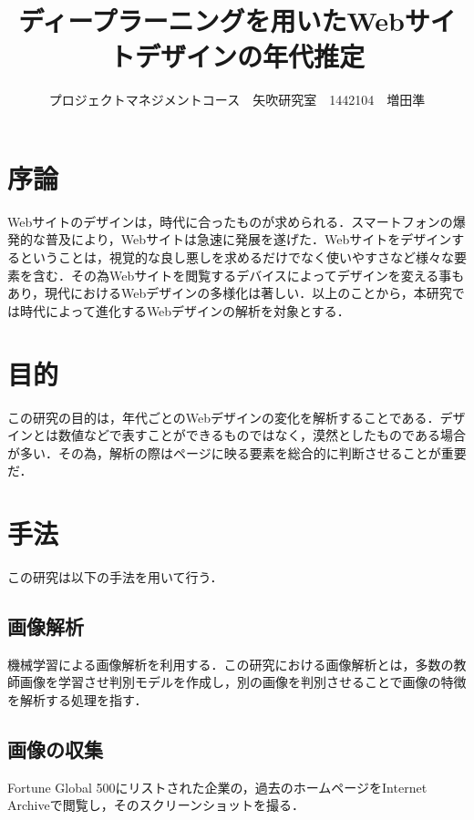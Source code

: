 \documentclass[uplatex,twocolumn,dvipdfmx]{jsarticle}
\title{\vspace{-5mm}\fontsize{14pt}{0pt}\selectfont ディープラーニングを用いたWebサイトデザインの年代推定}
\author{\normalsize プロジェクトマネジメントコース　矢吹研究室　1442104　増田準}
\date{}
\begin{document}
\fontsize{10.5pt}{\baselineskip}\selectfont
\maketitle





\section{序論}\label{序論}

Webサイトのデザインは，時代に合ったものが求められる\cite{bib001}．スマートフォンの爆発的な普及により，Webサイトは急速に発展を遂げた．Webサイトをデザインするということは，視覚的な良し悪しを求めるだけでなく使いやすさなど様々な要素を含む．その為Webサイトを閲覧するデバイスによってデザインを変える事もあり，現代におけるWebデザインの多様化は著しい．以上のことから，本研究では時代によって進化するWebデザインの解析を対象とする．

\section{目的}

この研究の目的は，年代ごとのWebデザインの変化を解析することである．デザインとは数値などで表すことができるものではなく，漠然としたものである場合が多い．その為，解析の際はページに映る要素を総合的に判断させることが重要だ．

\section{手法}

この研究は以下の手法を用いて行う． 

\subsection{画像解析}

機械学習による画像解析を利用する．この研究における画像解析とは，多数の教師画像を学習させ判別モデルを作成し，別の画像を判別させることで画像の特徴を解析する処理を指す．

\subsection{画像の収集}

Fortune Global 500\cite{bib002}にリストされた企業の，過去のホームページをInternet Archiveで閲覧し，そのスクリーンショットを撮る． 
\end{document}
